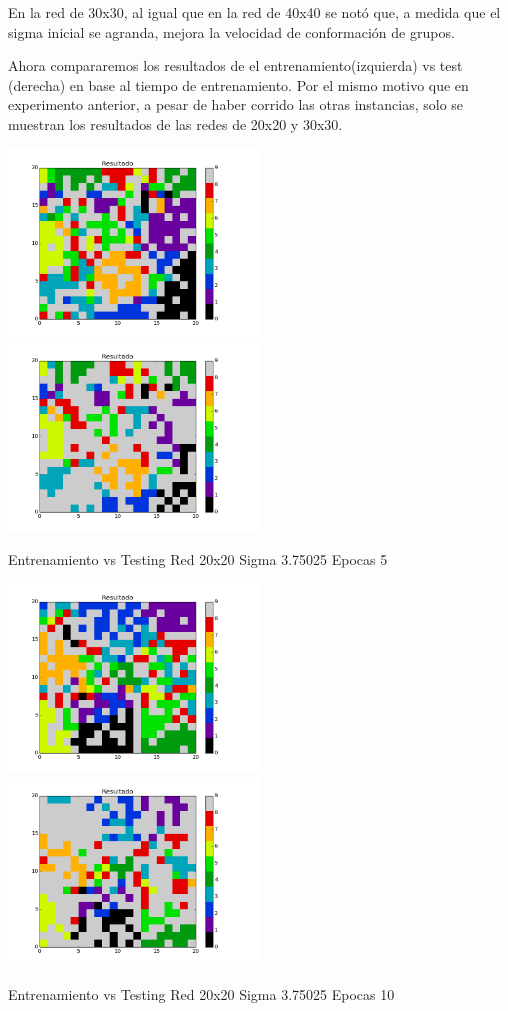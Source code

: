 En la red de 30x30, al igual que en la red de  40x40 se not\'o que, a medida que el sigma inicial se agranda, mejora la velocidad de conformaci\'on de grupos. 

Ahora compararemos los resultados de el entrenamiento(izquierda) vs test (derecha) en base al tiempo de entrenamiento. Por el mismo motivo que en experimento anterior, a pesar de haber corrido las otras instancias, solo se muestran los resultados de las redes de 20x20 y 30x30.

\includegraphics[width=0.5\textwidth]{img/Ej2_Epocas/train_M_20_sigma_3_75025_epocas_5}
\includegraphics[width=0.5\textwidth]{img/Ej2_Epocas/test_M_20_sigma_3_75025_epocas_5}
{\center \footnotesize Entrenamiento vs Testing Red 20x20 Sigma 3.75025 Epocas 5\par}

\includegraphics[width=0.5\textwidth]{img/Ej2_Epocas/train_M_20_sigma_3_75025_epocas_10}
\includegraphics[width=0.5\textwidth]{img/Ej2_Epocas/test_M_20_sigma_3_75025_epocas_10}
{\center \footnotesize Entrenamiento vs Testing Red 20x20 Sigma 3.75025 Epocas 10\par}

